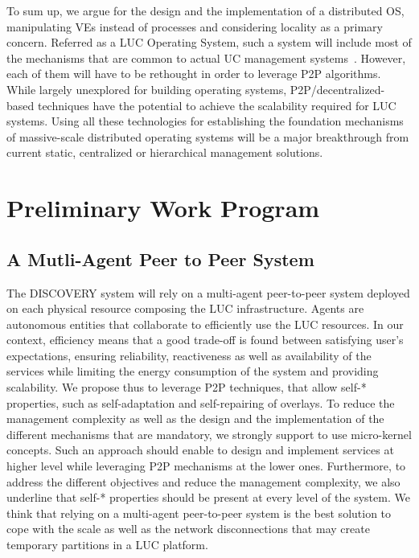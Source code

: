 \documentclass[11pt,a4paper,twoside]{article}
\newcommand{\discovery}{DISCOVERY\xspace}
\begin{document}
To sum up,  we argue for the design and the implementation of a distributed OS,
manipulating VEs instead of processes and considering locality as a primary concern. 
Referred as a LUC Operating System, such
a system will include most of the mechanisms that are common to actual UC
management systems~\cite{cloudstack,nimbus,opennebula,openstack,lowe:wiley11,moreno:2012}.  However,
each of them will have to be rethought in order to leverage P2P algorithms.
%
While largely unexplored for building operating systems,
P2P/decentralized-based techniques have the potential to achieve the scalability required
for LUC systems.
Using all these technologies for establishing the foundation mechanisms of
massive-scale distributed operating systems will be a major breakthrough from
current static, centralized or hierarchical management solutions.

\section{Preliminary Work Program}
\subsection{A Mutli-Agent Peer to Peer System}
The \discovery system will rely  on a multi-agent peer-to-peer system deployed on
each physical resource composing the LUC infrastructure. Agents are autonomous
entities that collaborate to efficiently use the LUC resources. In our context,
efficiency means that a good trade-off is found between satisfying user's
expectations, ensuring reliability, reactiveness as well as availability of the
services while limiting the energy consumption of the system and providing
scalability. We propose thus to leverage P2P techniques, that
allow self-* properties, such as self-adaptation and self-repairing of overlays. 
%
To reduce the management complexity as well as the design and the
implementation of the different mechanisms that are mandatory, we strongly
support to use micro-kernel concepts. Such an approach should enable to design
and implement services at higher level while leveraging P2P mechanisms
at the lower ones.  Furthermore, to address the different objectives and reduce
the management complexity, we also underline that self-* properties should be
present at every level of the system.  We think that relying on a multi-agent
peer-to-peer system is the best solution to cope with the scale as well as the
network disconnections that may create temporary partitions in a LUC platform.
\end{document}
